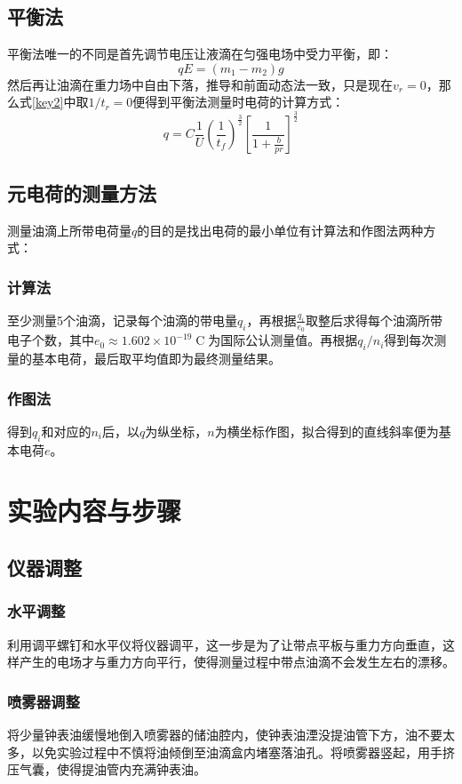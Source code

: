\documentclass{WHUReport}
\begin{document}
\begin{multicols}{2}
	\subsection{平衡法}
	平衡法唯一的不同是首先调节电压让液滴在匀强电场中受力平衡，即：
	\begin{equation}
		qE=(m_1-m_2)g
	\end{equation}
	然后再让油滴在重力场中自由下落，推导和前面动态法一致，只是现在$v_r=0$，那么式\ref{key2}中取$1/t_r=0$便得到平衡法测量时电荷的计算方式：
	\begin{equation}\label{12}
		q=C\frac{1}{U}\left(\frac{1}{t_f}\right)^{\frac{3}{2}}\left[\frac{1}{1+\frac{b}{pr}}\right]^{\frac{3}{2}}
	\end{equation}
	\subsection{元电荷的测量方法}
	测量油滴上所带电荷量$q$的目的是找出电荷的最小单位有计算法和作图法两种方式：
	\subsubsection{计算法}
	至少测量5个油滴，记录每个油滴的带电量$q_i$，再根据$\frac{q_i}{e_0}$取整后求得每个油滴所带电子个数，其中$e_0\approx 1.602\times 10^{-19}\operatorname{C}$为国际公认测量值。再根据$q_i/n_i$得到每次测量的基本电荷，最后取平均值即为最终测量结果。
	\subsubsection{作图法}
	得到$q_i$和对应的$n_i$后，以$q$为纵坐标，$n$为横坐标作图，拟合得到的直线斜率便为基本电荷$e$。
	\section{实验内容与步骤}
	\subsection{仪器调整}
	\subsubsection{水平调整}
	利用调平螺钉和水平仪将仪器调平，这一步是为了让带点平板与重力方向垂直，这样产生的电场才与重力方向平行，使得测量过程中带点油滴不会发生左右的漂移。
	\subsubsection{喷雾器调整}
	将少量钟表油缓慢地倒入喷雾器的储油腔内，使钟表油湮没提油管下方，油不要太多，以免实验过程中不慎将油倾倒至油滴盒内堵塞落油孔。将喷雾器竖起，用手挤压气囊，使得提油管内充满钟表油。

\end{multicols}
\end{document}
